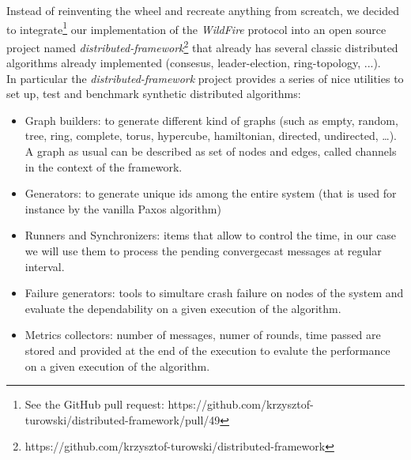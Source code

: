 \documentclass{article}
\begin{document}
Instead of reinventing the wheel and recreate anything from screatch, we decided to integrate\footnote{See the GitHub pull request: https://github.com/krzysztof-turowski/distributed-framework/pull/49} our implementation of the \emph{WildFire} protocol into an open source project named \emph{distributed-framework}\footnote{https://github.com/krzysztof-turowski/distributed-framework} that already has several classic distributed algorithms already implemented (consesus, leader-election, ring-topology, ...). \\
In particular the \emph{distributed-framework} project provides a series of nice utilities to set up, test and benchmark synthetic distributed algorithms: 
\begin{itemize}
  \item Graph builders: to generate different kind of graphs (such as empty, random, tree, ring, complete, torus, hypercube, hamiltonian, directed, undirected, …). A graph as usual can be described as set of nodes and edges, called channels in the context of the framework.
  \item Generators: to generate unique ids among the entire system (that is used for instance by the vanilla Paxos algorithm)
  \item Runners and Synchronizers: items that allow to control the time, in our case we will use them to process the pending convergecast messages at regular interval.
  \item Failure generators: tools to simultare crash failure on nodes of the system and evaluate the dependability on a given execution of the algorithm.
  \item Metrics collectors: number of messages, numer of rounds, time passed are stored and provided at the end of the execution to evalute the performance on a given execution of the algorithm.
\end{itemize}
\end{document}
